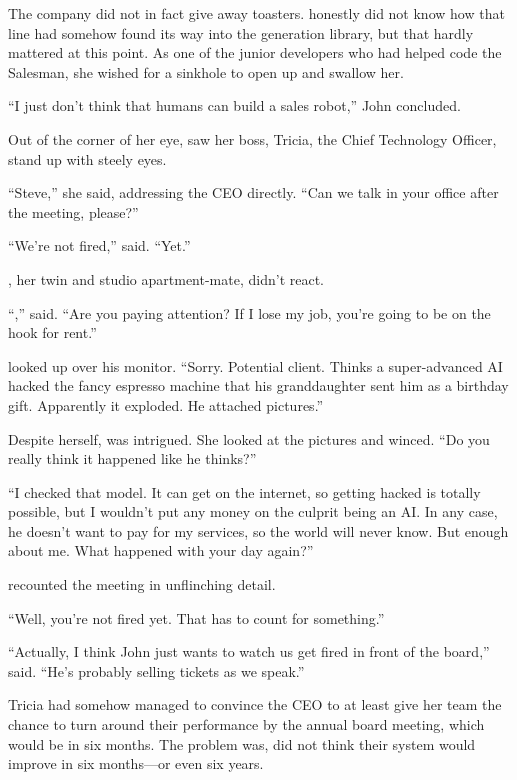 The company did not in fact give away toasters. {\protag} honestly did not know how that line had somehow found its way into the generation library, but that hardly mattered at this point. As one of the junior developers who had helped code the Salesman, she wished for a sinkhole to open up and swallow her.

``I just don't think that humans can build a sales robot,'' John concluded.

Out of the corner of her eye, {\protag} saw her boss, Tricia, the Chief Technology Officer, stand up with steely eyes.

``Steve,'' she said, addressing the CEO directly. ``Can we talk in your office after the meeting, please?''

\bigbreak

``We're not fired,'' {\protag} said. ``Yet.''

{\sidetag}, her twin and studio apartment-mate, didn't react.

``{\sidetag},'' {\protag} said. ``Are you paying attention? If I lose my job, you're going to be on the hook for rent.''

{\sidetag} looked up over his monitor. ``Sorry. Potential client. Thinks a super-advanced AI hacked the fancy espresso machine that his granddaughter sent him as a birthday gift. Apparently it exploded. He attached pictures.''

Despite herself, {\protag} was intrigued. She looked at the pictures and winced. ``Do you really think it happened like he thinks?''

``I checked that model. It can get on the internet, so getting hacked is totally possible, but I wouldn't put any money on the culprit being an AI. In any case, he doesn't want to pay for my services, so the world will never know. But enough about me. What happened with your day again?''

{\protag} recounted the meeting in unflinching detail.

``Well, you're not fired yet. That has to count for something.''

``Actually, I think John just wants to watch us get fired in front of the board,'' {\protag} said. ``He's probably selling tickets as we speak.''

Tricia had somehow managed to convince the CEO to at least give her team the chance to turn around their performance by the annual board meeting, which would be in six months. The problem was, {\protag} did not think their system would improve in six months---or even six years. 

